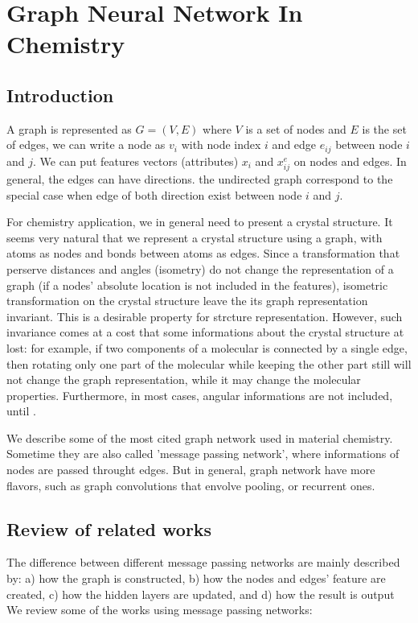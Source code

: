 \documentclass{article}
\begin{document}
\section{Graph Neural Network In Chemistry}
\subsection{Introduction}
A graph is represented as $G = (V,E)$ where $V$ is a set of nodes and $E$ is the set of edges\cite{wu_2021}, we can
write a node as $v_i$ with node index $i$ and edge $e_{ij}$ between node $i$ and $j$. 
We can put features vectors (attributes) $x_i$ and $x^e_{ij}$ on nodes and edges. 
In general, the edges can have directions. the undirected graph correspond to the special case when edge of both
direction exist between node $i$ and $j$.

For chemistry application, we in general need to present a crystal structure. 
It seems very natural that we represent a crystal structure using a graph, with atoms as nodes and bonds between atoms 
as edges. 
Since a transformation that perserve distances and angles (isometry) do not change the representation of a graph 
(if a nodes' absolute location is not included in the features), isometric transformation on the crystal structure
leave the its graph representation invariant. This is a desirable property for strcture representation. 
However, such invariance comes at a cost that some informations about the crystal structure at lost: for example, if two 
components of a molecular is connected by a single edge, then rotating only one part of the molecular while keeping the 
other part still will not change the graph representation, while it may change the molecular properties. 
Furthermore, in most cases, angular informations are not included, until \cite{directional_klicpera}. 

We describe some of the most cited graph network used in material chemistry. Sometime they are also called 
'message passing network', where informations of nodes are passed throught edges. But in general, graph network 
have more flavors, such as graph convolutions that envolve pooling, or recurrent ones. 

\subsection{Review of related works}
The difference between different message passing networks are mainly described by:
a) how the graph is constructed, 
b) how the nodes and edges' feature are created,
c) how the hidden layers are updated, and
d) how the result is output
We review some of the works using message passing networks:
\end{document}
